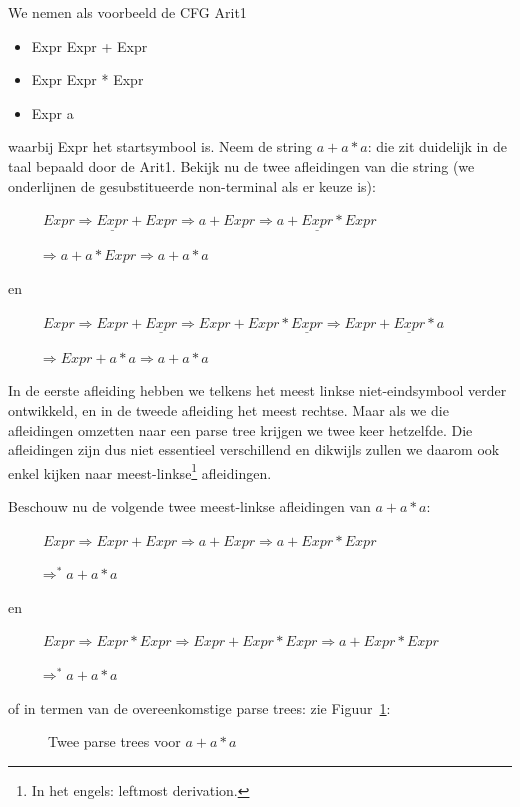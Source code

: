 We nemen als voorbeeld de CFG Arit1\label{arit1label}
\begin{itemize}
\item Expr \rpijl Expr + Expr
\item Expr \rpijl Expr * Expr
\item Expr \rpijl a
\end{itemize}
waarbij Expr het startsymbool is. Neem de string $a+a*a$: die zit
duidelijk in de taal bepaald door de Arit1. Bekijk nu de twee
afleidingen van die string (we onderlijnen de gesubstitueerde
non-terminal als er keuze is): 

~~~~~$Expr \Rightarrow \underline{Expr} + Expr \Rightarrow a + Expr \Rightarrow a + \underline{Expr} * Expr$

$~~~~~~~~~~\Rightarrow a + a * Expr \Rightarrow a + a * a$

en

~~~~~$Expr \Rightarrow Expr + \underline{Expr} \Rightarrow Expr + Expr * \underline{Expr} \Rightarrow Expr + \underline{Expr} * a$

$~~~~~~~~~~\Rightarrow Expr + a * a \Rightarrow a + a * a$


In de eerste afleiding hebben we telkens het meest linkse
niet-eindsymbool verder ontwikkeld, en in de tweede afleiding het
meest rechtse. Maar als we die afleidingen omzetten naar een parse
tree krijgen we twee keer hetzelfde. Die afleidingen zijn dus niet
essentieel verschillend en dikwijls zullen we daarom ook enkel kijken
naar meest-linkse\footnote{In het engels: leftmost derivation.}
afleidingen.


Beschouw nu de volgende twee meest-linkse afleidingen van $a+a*a$:



~~~~~$Expr \Rightarrow Expr + Expr \Rightarrow a + Expr \Rightarrow a + Expr * Expr$

$~~~~~~~~~~\Rightarrow^* a + a * a$

en

~~~~~$Expr \Rightarrow Expr * Expr \Rightarrow Expr + Expr * Expr  \Rightarrow a + Expr * Expr$

$~~~~~~~~~~\Rightarrow^* a + a * a$

of in termen van de overeenkomstige parse trees: zie Figuur~\ref{ambi1}:

\begin{figure}[h]
\caption{Twee parse trees voor $a+a*a$\label{ambi1}}
\end{figure}

